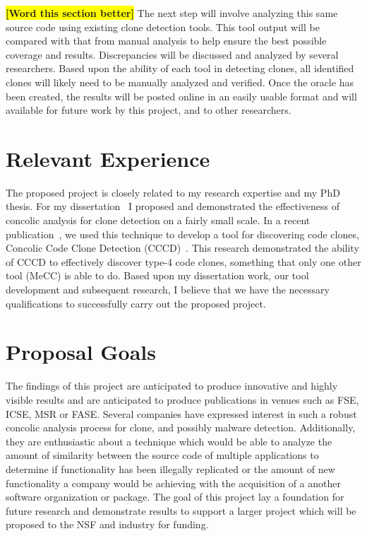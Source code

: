\documentclass{article}
\newcommand{\todo}[1]{\colorbox{yellow}{\textbf{[#1]}}}
\begin{document}
\todo{Word this section better}
The next step will involve analyzing this same source code using existing clone detection tools. This tool output will be compared with that from manual analysis to help ensure the best possible coverage and results. Discrepancies will be discussed and analyzed by several researchers. Based upon the ability of each tool in detecting clones, all identified clones will likely need to be manually analyzed and verified. Once the oracle has been created, the results will be posted online in an easily usable format and will available for future work by this project, and to other researchers.


\section{Relevant Experience}

The proposed project is closely related to my research expertise and my PhD thesis. For my dissertation~\cite{Dan123} I proposed and demonstrated the effectiveness of concolic analysis for clone detection on a fairly small scale. In a recent publication~\cite{wcre2013}, we used this technique to develop a tool for discovering code clones, Concolic Code Clone Detection (CCCD)~\cite{wcre2013}. This research demonstrated the ability of CCCD to effectively discover type-4 code clones, something that only one other tool (MeCC) is able to do. Based upon my dissertation work, our tool development and subsequent research, I believe that we have the necessary qualifications to successfully carry out the proposed project.

\section{Proposal Goals} %

The findings of this project are anticipated to produce innovative and highly visible results and are anticipated to produce publications in venues such as FSE, ICSE, MSR or FASE. Several companies have expressed interest in such a robust concolic analysis process for clone, and possibly malware detection. Additionally, they are enthusiastic about a technique which would be able to analyze the amount of similarity between the source code of multiple applications to determine if functionality has been illegally replicated or the amount of new functionality a company would be achieving with the acquisition of a another software organization or package. The goal of this project lay a foundation for future research and demonstrate results to support a larger project which will be proposed to the NSF and industry for funding.
\end{document}
